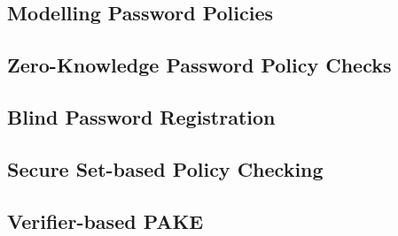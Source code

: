 \documentclass[notes,xcolor=dvipsnames]{beamer}
\begin{document}
\newsavebox{\savelisting}
\newenvironment{listing}
{\vspace*{-2em}\begin{lrbox}{\savelisting}
\begin{minipage}{4.8in}
\begin{flushleft}}
{\end{flushleft}
\end{minipage}
\end{lrbox}
\begin{center}
\resizebox{\columnwidth}{!}{\setlength\fboxsep{6pt}\fbox{\usebox{\savelisting}}}
\end{center}}

\subsection{Modelling Password Policies}

\subsection[ZKPPC]{Zero-Knowledge Password Policy Checks}

\subsection[BPR]{Blind Password Registration}

\subsection[SPC]{Secure Set-based Policy Checking}

\subsection[VPAKE]{Verifier-based PAKE}
\end{document}
